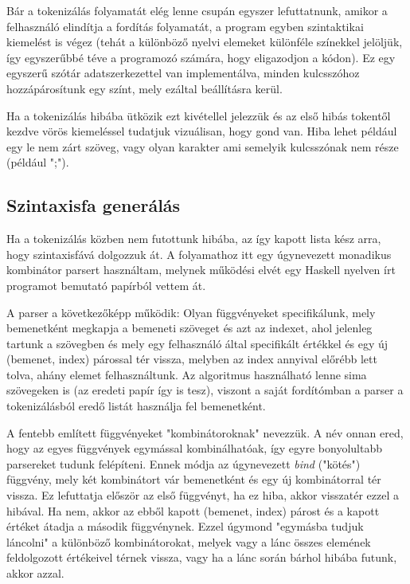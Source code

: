 Bár a tokenizálás folyamatát elég lenne csupán egyszer lefuttatnunk, amikor a felhasználó elindítja a fordítás folyamatát, a program egyben szintaktikai kiemelést is végez (tehát a különböző nyelvi elemeket különféle színekkel jelöljük, így egyszerűbbé téve a programozó számára, hogy eligazodjon a kódon). Ez egy egyszerű szótár adatszerkezettel van implementálva, minden kulcsszóhoz hozzápárosítunk egy színt, mely ezáltal beállításra kerül.

Ha a tokenizálás hibába ütközik ezt kivétellel jelezzük és az első hibás tokentől kezdve vörös kiemeléssel tudatjuk vizuálisan, hogy gond van. Hiba lehet például egy le nem zárt szöveg, vagy olyan karakter ami semelyik kulcsszónak nem része (például ";").

\subsection{Szintaxisfa generálás}

Ha a tokenizálás közben nem futottunk hibába, az így kapott lista kész arra, hogy szintaxisfává dolgozzuk át. A folyamathoz itt egy úgynevezett monadikus kombinátor parsert használtam, melynek működési elvét egy Haskell nyelven írt programot bemutató papírból vettem át.

A parser a következőképp működik: Olyan függvényeket specifikálunk, mely bemenetként megkapja a bemeneti szöveget és azt az indexet, ahol jelenleg tartunk a szövegben és mely egy felhasználó által specifikált értékkel és egy új (bemenet, index) párossal tér vissza, melyben az index annyival előrébb lett tolva, ahány elemet felhasználtunk. Az algoritmus használható lenne sima szövegeken is (az eredeti papír így is tesz), viszont a saját fordítómban a parser a tokenizálásból eredő listát használja fel bemenetként.

A fentebb említett függvényeket "kombinátoroknak" nevezzük. A név onnan ered, hogy az egyes függvények egymással kombinálhatóak, így egyre bonyolultabb parsereket tudunk felépíteni. Ennek módja az úgynevezett \textit{bind} ("kötés") függvény, mely két kombinátort vár bemenetként és egy új kombinátorral tér vissza. Ez lefuttatja először az első függvényt, ha ez hiba, akkor visszatér ezzel a hibával. Ha nem, akkor az ebből kapott (bemenet, index) párost és a kapott értéket átadja a második függvénynek. Ezzel úgymond "egymásba tudjuk láncolni" a különböző kombinátorokat, melyek vagy a lánc összes elemének feldolgozott értékeivel térnek vissza, vagy ha a lánc során bárhol hibába futunk, akkor azzal.

